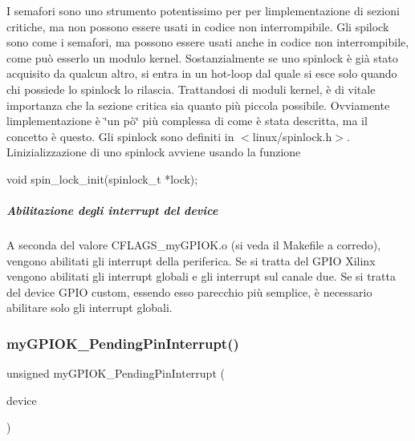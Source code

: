 I semafori sono uno strumento potentissimo per per l\textquotesingle{}implementazione di sezioni critiche, ma non possono essere usati in codice non interrompibile. Gli spilock sono come i semafori, ma possono essere usati anche in codice non interrompibile, come può esserlo un modulo kernel. Sostanzialmente se uno spinlock è già stato acquisito da qualcun altro, si entra in un hot-\/loop dal quale si esce solo quando chi possiede lo spinlock lo rilascia. Trattandosi di moduli kernel, è di vitale importanza che la sezione critica sia quanto più piccola possibile. Ovviamente l\textquotesingle{}implementazione è \char`\"{}un pò\char`\"{} più complessa di come è stata descritta, ma il concetto è questo. Gli spinlock sono definiti in $<$linux/spinlock.\+h$>$. L\textquotesingle{}inizializzazione di uno spinlock avviene usando la funzione 
\begin{DoxyCode}
\textcolor{keywordtype}{void} spin\_lock\_init(spinlock\_t *lock);
\end{DoxyCode}


\subparagraph*{Abilitazione degli interrupt del device}

A seconda del valore C\+F\+L\+A\+G\+S\+\_\+my\+G\+P\+I\+O\+K.\+o (si veda il Makefile a corredo), vengono abilitati gli interrupt della periferica. Se si tratta del G\+P\+IO Xilinx vengono abilitati gli interrupt globali e gli interrupt sul canale due. Se si tratta del device G\+P\+IO custom, essendo esso parecchio più semplice, è necessario abilitare solo gli interrupt globali.\mbox{\label{group__my_g_p_i_o_k__t_ga1b3ad44b9198f537493180d748de0b6c}} 
\subsubsection{\texorpdfstring{my\+G\+P\+I\+O\+K\+\_\+\+Pending\+Pin\+Interrupt()}{myGPIOK\_PendingPinInterrupt()}}
{\footnotesize\ttfamily unsigned my\+G\+P\+I\+O\+K\+\_\+\+Pending\+Pin\+Interrupt (\begin{DoxyParamCaption}\item[{\hyperlink{structmy_g_p_i_o_k__t}{my\+G\+P\+I\+O\+K\+\_\+t} $\ast$}]{device }\end{DoxyParamCaption})}



